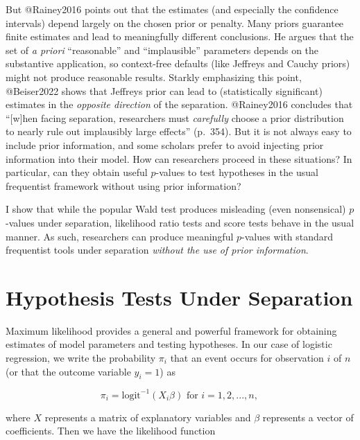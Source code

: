 \documentclass[
]{article}
\begin{document}
But @Rainey2016 points out that the estimates (and especially the
confidence intervals) depend largely on the chosen prior or penalty.
Many priors guarantee finite estimates and lead to meaningfully
different conclusions. He argues that the set of \emph{a priori}
``reasonable'' and ``implausible'' parameters depends on the substantive
application, so context-free defaults (like Jeffreys and Cauchy priors)
might not produce reasonable results. Starkly emphasizing this point,
@Beiser2022 shows that Jeffreys prior can lead to (statistically
significant) estimates in the \emph{opposite direction} of the
separation. @Rainey2016 concludes that ``{[}w{]}hen facing separation,
researchers must \emph{carefully} choose a prior distribution to nearly
rule out implausibly large effects'' (p.~354). But it is not always easy
to include prior information, and some scholars prefer to avoid
injecting prior information into their model. How can researchers
proceed in these situations? In particular, can they obtain useful
\(p\)-values to test hypotheses in the usual frequentist framework
without using prior information?

I show that while the popular Wald test produces misleading (even
nonsensical) \(p\)-values under separation, likelihood ratio tests and
score tests behave in the usual manner. As such, researchers can produce
meaningful \(p\)-values with standard frequentist tools under separation
\emph{without the use of prior information}.

\hypertarget{hypothesis-tests-under-separation}{%
\section{Hypothesis Tests Under
Separation}\label{hypothesis-tests-under-separation}}

Maximum likelihood provides a general and powerful framework for
obtaining estimates of model parameters and testing hypotheses. In our
case of logistic regression, we write the probability \(\pi_i\) that an
event occurs for observation \(i\) of \(n\) (or that the outcome
variable \(y_i = 1\)) as

\begin{equation*}
\pi_i = \text{logit}^{-1}(X_i\beta)\text{ for } i = 1, 2, ... , n \text{, }
\end{equation*}

\noindent where \(X\) represents a matrix of explanatory variables and
\(\beta\) represents a vector of coefficients. Then we have the
likelihood function
\end{document}
